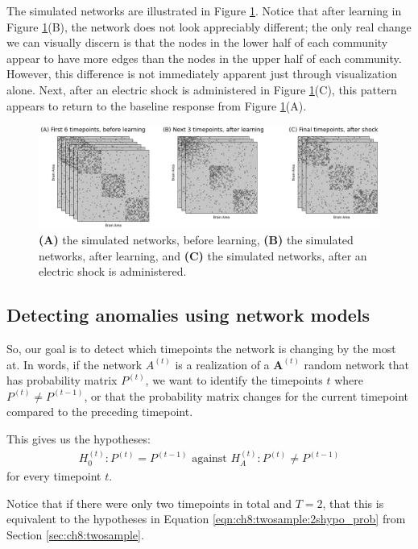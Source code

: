 The simulated networks are illustrated in Figure \ref{fig:ch9:anomaly:ex}. Notice that after learning in Figure \ref{fig:ch9:anomaly:ex}(B), the network does not look appreciably different; the only real change we can visually discern is that the nodes in the lower half of each community appear to have more edges than the nodes in the upper half of each community. However, this difference is not immediately apparent just through visualization alone. Next, after an electric shock is administered in Figure \ref{fig:ch9:anomaly:ex}(C), this pattern appears to return to the baseline response from Figure \ref{fig:ch9:anomaly:ex}(A).

\begin{figure}[h]
    \centering
    \includegraphics[width=\linewidth]{applications/ch9/Images/anom_ex.png}
    \caption[Longitudinal network data]{\textbf{(A)} the simulated networks, before learning, \textbf{(B)} the simulated networks, after learning, and \textbf{(C)} the simulated networks, after an electric shock is administered.}
    \label{fig:ch9:anomaly:ex}
\end{figure}

\subsection{Detecting anomalies using network models}

So, our goal is to detect which timepoints the network is changing by the most at. In words, if the network $A^{(t)}$ is a realization of a $\mathbf A^{(t)}$ random network that has probability matrix $P^{(t)}$, we want to identify the timepoints $t$ where $P^{(t)} \neq P^{(t - 1)}$, or that the probability matrix changes for the current timepoint compared to the preceding timepoint.

This gives us the hypotheses:
\begin{align*}
    H_0^{(t)} : P^{(t)} = P^{(t - 1)} \text{ against }H_A^{(t)} : P^{(t)} \neq P^{(t - 1)}
\end{align*}
for every timepoint $t$. 

Notice that if there were only two timepoints in total and $T = 2$, that this is equivalent to the hypotheses in Equation \eqref{eqn:ch8:twosample:2shypo_prob} from Section \ref{sec:ch8:twosample}. 

